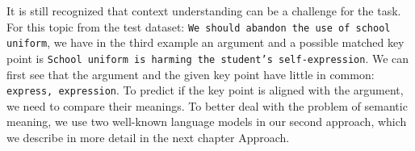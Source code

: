 It is still recognized that context understanding can be a challenge for the task. For this topic from the test dataset:
\texttt{We should abandon the use of school uniform}, we have in the third example an argument and a possible matched key point is \texttt{School uniform is harming the student's self-expression}. 
We can first see that the argument and the given key point have little in common: \texttt{express, expression}. 
To predict if the key point is aligned with the argument, we need to compare their meanings. 
To better deal with the problem of semantic meaning, we use two well-known language models in our second approach, which we describe in more detail in the next chapter Approach.
